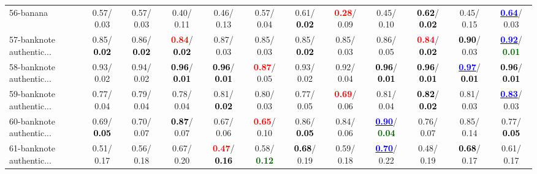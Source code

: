 \begin{table}[h]
\begin{center}
{\begin{tabular}{lc|c|c|c|c|c|c|c|c|c|c}
56-banana &   0.57/  0.03 &   0.57/  0.03 &   0.40/  0.11 &   0.46/  0.13 &   0.57/  0.04 &   0.61/\textcolor{black}{\textbf{  0.02}} & \textcolor{red}{\textbf{  0.28}}/  0.09 &   0.45/  0.10 & \textcolor{black}{\textbf{  0.62}}/\textcolor{black}{\textbf{  0.02}} &   0.45/  0.15 & \underline{\textcolor{blue}{\textbf{  0.64}}}/  0.03 \\
57-banknote authentic... &   0.85/\textcolor{black}{\textbf{  0.02}} &   0.86/\textcolor{black}{\textbf{  0.02}} & \textcolor{red}{\textbf{  0.84}}/\textcolor{black}{\textbf{  0.02}} &   0.87/  0.03 &   0.85/  0.03 &   0.85/\textcolor{black}{\textbf{  0.02}} &   0.85/  0.03 &   0.86/  0.05 & \textcolor{red}{\textbf{  0.84}}/\textcolor{black}{\textbf{  0.02}} & \textcolor{black}{\textbf{  0.90}}/  0.03 & \underline{\textcolor{blue}{\textbf{  0.92}}}/\textcolor{darkgreen}{\textbf{  0.01}} \\
58-banknote authentic... &   0.93/  0.02 &   0.94/  0.02 & \textcolor{black}{\textbf{  0.96}}/\textcolor{black}{\textbf{  0.01}} & \textcolor{black}{\textbf{  0.96}}/\textcolor{black}{\textbf{  0.01}} & \textcolor{red}{\textbf{  0.87}}/  0.05 &   0.93/  0.02 &   0.92/  0.04 & \textcolor{black}{\textbf{  0.96}}/\textcolor{black}{\textbf{  0.01}} & \textcolor{black}{\textbf{  0.96}}/\textcolor{black}{\textbf{  0.01}} & \underline{\textcolor{blue}{\textbf{  0.97}}}/\textcolor{black}{\textbf{  0.01}} & \textcolor{black}{\textbf{  0.96}}/\textcolor{black}{\textbf{  0.01}} \\
59-banknote authentic... &   0.77/  0.04 &   0.79/  0.04 &   0.78/  0.04 &   0.81/\textcolor{black}{\textbf{  0.02}} &   0.80/  0.03 &   0.77/  0.05 & \textcolor{red}{\textbf{  0.69}}/  0.06 &   0.81/  0.04 & \textcolor{black}{\textbf{  0.82}}/\textcolor{black}{\textbf{  0.02}} &   0.81/  0.03 & \underline{\textcolor{blue}{\textbf{  0.83}}}/  0.03 \\
60-banknote authentic... &   0.69/\textcolor{black}{\textbf{  0.05}} &   0.70/  0.07 & \textcolor{black}{\textbf{  0.87}}/  0.07 &   0.67/  0.06 & \textcolor{red}{\textbf{  0.65}}/  0.10 &   0.86/\textcolor{black}{\textbf{  0.05}} &   0.84/  0.06 & \underline{\textcolor{blue}{\textbf{  0.90}}}/\textcolor{darkgreen}{\textbf{  0.04}} &   0.76/  0.07 &   0.85/  0.14 &   0.77/\textcolor{black}{\textbf{  0.05}} \\ \hline
61-banknote authentic... &   0.51/  0.17 &   0.56/  0.18 &   0.67/  0.20 & \textcolor{red}{\textbf{  0.47}}/\textcolor{black}{\textbf{  0.16}} &   0.58/\textcolor{darkgreen}{\textbf{  0.12}} & \textcolor{black}{\textbf{  0.68}}/  0.19 &   0.59/  0.18 & \underline{\textcolor{blue}{\textbf{  0.70}}}/  0.22 &   0.48/  0.19 & \textcolor{black}{\textbf{  0.68}}/  0.17 &   0.61/  0.17 \\

\end{tabular}}
\end{center}
\end{table}
